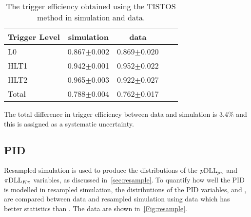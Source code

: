 \begin{table}[ht]
  \centering
  \begin{tabular}{l c c c c}
    \hline
    Trigger Level & simulation & data \\
    \hline
    L0 &   0.867$\pm$0.002 & 0.869$\pm$0.020\\
    HLT1 &  0.942$\pm$0.001 & 0.952$\pm$0.022\\
    HLT2 &   0.965$\pm$0.003 & 0.922$\pm$0.027\\
    \hline
     Total &   0.788$\pm$0.004 & 0.762$\pm$0.017\\
     \hline
  \end{tabular}
  \caption{The trigger efficiency obtained using the TISTOS method in simulation and data.}
  \label{Tab:tistos}
\end{table}


The total difference in trigger efficiency between data and simulation is 3.4\% and this is assigned as a systematic uncertainty. %
\subsection{PID}
\label{sec:pidsys}
Resampled simulation is used to produce the distributions of the $p\mathrm{DLL}_{{p}{\pi}}$ and $\pi\mathrm{DLL}_{{K}{\pi}}$ variables, as discussed in~\autoref{sec:resample}. To quantify how well the PID is modelled in resampled simulation, the distributions of the PID variables, \dllppi and \dllkpi, are compared between data and resampled simulation using \LbKjpsi data which has better statistics than \Lbpijpsi. The data are shown in~\autoref{Fig:resample}. %

